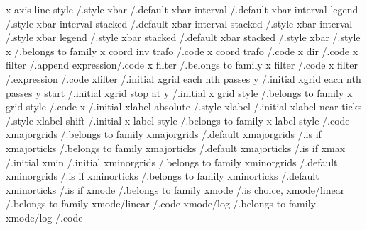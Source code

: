 x axis line style             /.style            
xbar                          /.default          
xbar interval                 /.default          
xbar interval legend          /.style            
xbar interval stacked         /.default          
xbar interval stacked         /.style            
xbar interval                 /.style            
xbar legend                   /.style            
xbar stacked                  /.default          
xbar stacked                  /.style            
xbar                          /.style            
x                             /.belongs to family
x coord inv trafo             /.code             
x coord trafo                 /.code             
x dir                         /.code             
x filter                      /.append expression/.code
x filter                      /.belongs to family
x filter                      /.code             
x filter                      /.expression       /.code
xfilter                       /.initial          
xgrid each nth passes y       /.initial          
xgrid each nth passes y start /.initial          
xgrid stop at y               /.initial          
x grid style                  /.belongs to family
x grid style                  /.code             
x                             /.initial          
xlabel absolute               /.style            
xlabel                        /.initial          
xlabel near ticks             /.style            
xlabel shift                  /.initial          
x label style                 /.belongs to family
x label style                 /.code             
xmajorgrids                   /.belongs to family
xmajorgrids                   /.default          
xmajorgrids                   /.is if            
xmajorticks                   /.belongs to family
xmajorticks                   /.default          
xmajorticks                   /.is if            
xmax                          /.initial          
xmin                          /.initial          
xminorgrids                   /.belongs to family
xminorgrids                   /.default          
xminorgrids                   /.is if            
xminorticks                   /.belongs to family
xminorticks                   /.default          
xminorticks                   /.is if            
xmode                         /.belongs to family
xmode                         /.is choice,       
xmode/linear                  /.belongs to family
xmode/linear                  /.code             
xmode/log                     /.belongs to family
xmode/log                     /.code             
